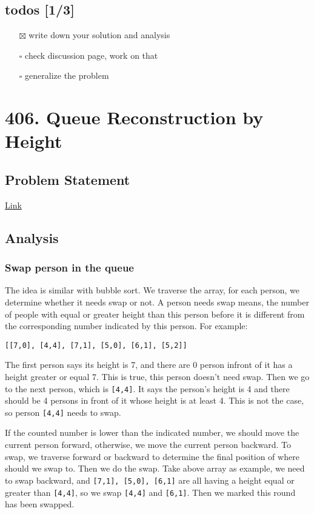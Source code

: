\documentclass[11pt]{article}
\begin{document}
\subsection{todos [1/3]}
\label{sec:orgfea2f93}
\begin{itemize}
\item[{$\boxtimes$}] write down your solution and analysis
\item[{$\square$}] check discussion page, work on that
\item[{$\square$}] generalize the problem
\end{itemize}
\section{406. Queue Reconstruction by Height}
\label{sec:org09f55d5}
\subsection{Problem Statement}
\label{sec:orge999d3f}
\href{https://leetcode.com/problems/queue-reconstruction-by-height/}{Link}
\subsection{Analysis}
\label{sec:orga01191b}
\subsubsection{Swap person in the queue}
\label{sec:org7717204}
The idea is similar with bubble sort. We traverse the array, for each person, we determine whether it needs swap or not. A person needs swap means, the number of people with equal or greater height than this person before it is different from the corresponding number indicated by this person. For example:
\begin{Verbatim}[frame=single]
[[7,0], [4,4], [7,1], [5,0], [6,1], [5,2]]
\end{Verbatim}
The first person says its height is 7, and there are 0 person infront of it has a height greater or equal 7. This is true, this person doesn't need swap. Then we go to the next person, which is \texttt{[4,4]}. It says the person's height is 4 and there should be 4 persons in front of it whose height is at least 4. This is not the case, so person \texttt{[4,4]} needs to swap.

If the counted number is lower than the indicated number, we should move the current person forward, otherwise, we move the current person backward. To swap, we traverse forward or backward to determine the final position of where should we swap to. Then we do the swap. Take above array as example, we need to swap backward, and \texttt{[7,1], [5,0], [6,1]} are all having a height equal or greater than \texttt{[4,4]}, so we swap \texttt{[4,4]} and \texttt{[6,1]}. Then we marked this round has been swapped.
\end{document}

